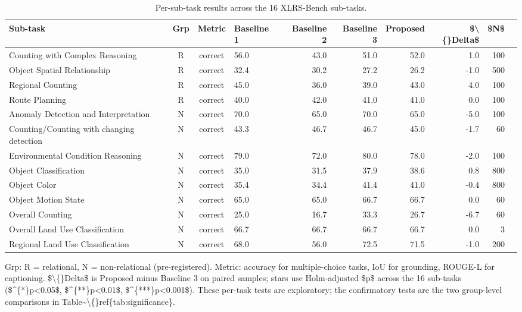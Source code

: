 \begin{table}[t]
\centering
\small
\begin{tabular}{lcclrrrrrr}
\toprule
Sub-task & Grp & Metric & Baseline 1 & Baseline 2 & Baseline 3 & Proposed & \$\textbackslash\{\}Delta\$ & \$N\$ \\
\midrule
Counting with Complex Reasoning & R & correct & 56.0 & 43.0 & 51.0 & 52.0 & 1.0 & 100 \\
Object Spatial Relationship & R & correct & 32.4 & 30.2 & 27.2 & 26.2 & -1.0 & 500 \\
Regional Counting & R & correct & 45.0 & 36.0 & 39.0 & 43.0 & 4.0 & 100 \\
Route Planning & R & correct & 40.0 & 42.0 & 41.0 & 41.0 & 0.0 & 100 \\
Anomaly Detection and Interpretation & N & correct & 70.0 & 65.0 & 70.0 & 65.0 & -5.0 & 100 \\
Counting/Counting with changing detection & N & correct & 43.3 & 46.7 & 46.7 & 45.0 & -1.7 & 60 \\
Environmental Condition Reasoning & N & correct & 79.0 & 72.0 & 80.0 & 78.0 & -2.0 & 100 \\
Object Classification & N & correct & 35.0 & 31.5 & 37.9 & 38.6 & 0.8 & 800 \\
Object Color & N & correct & 35.4 & 34.4 & 41.4 & 41.0 & -0.4 & 800 \\
Object Motion State & N & correct & 65.0 & 65.0 & 66.7 & 66.7 & 0.0 & 60 \\
Overall Counting & N & correct & 25.0 & 16.7 & 33.3 & 26.7 & -6.7 & 60 \\
Overall Land Use Classification & N & correct & 66.7 & 66.7 & 66.7 & 66.7 & 0.0 & 3 \\
Regional Land Use Classification & N & correct & 68.0 & 56.0 & 72.5 & 71.5 & -1.0 & 200 \\
\bottomrule
\end{tabular}
\vspace{2pt}
\begin{minipage}{\linewidth}\footnotesize Grp: R = relational, N = non-relational (pre-registered). Metric: accuracy for multiple-choice tasks, IoU for grounding, ROUGE-L for captioning. \$\textbackslash\{\}Delta\$ is Proposed minus Baseline 3 on paired samples; stars use Holm-adjusted \$p\$ across the 16 sub-tasks (\$\textasciicircum{}\{*\}p<0.05\$, \$\textasciicircum{}\{**\}p<0.01\$, \$\textasciicircum{}\{***\}p<0.001\$). These per-task tests are exploratory; the confirmatory tests are the two group-level comparisons in Table\textasciitilde{}\textbackslash\{\}ref\{tab:significance\}.\end{minipage}
\caption{Per-sub-task results across the 16 XLRS-Bench sub-tasks.}
\label{tab:pertask}
\end{table}

